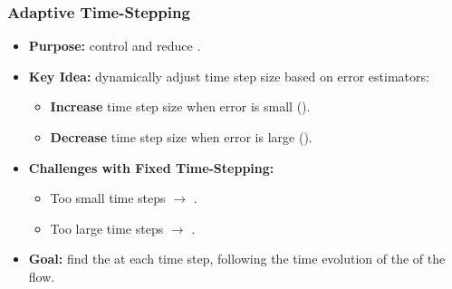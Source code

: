 \documentclass{settings/laserbeam}
\begin{document}
\begin{frame}
    
    \frametitle{Adaptive Time-Stepping}

    \begin{cbox}
    \begin{itemize}
        \item \textbf{Purpose:} control  and reduce .
        \item \textbf{Key Idea:} dynamically adjust time step size based on error estimators:
        \begin{itemize}
            \item \textbf{Increase} time step size when error is small ().
            \item \textbf{Decrease} time step size when error is large ().
        \end{itemize}
        \item \textbf{Challenges with Fixed Time-Stepping:}
        \begin{itemize}
            \item Too small time steps $\rightarrow$ .
            \item Too large time steps $\rightarrow$ .
        \end{itemize}
        \item \textbf{Goal:} find the  at each time step, following the time evolution of the  of the flow.
    \end{itemize}
    \end{cbox}

\end{frame}
\end{document}
